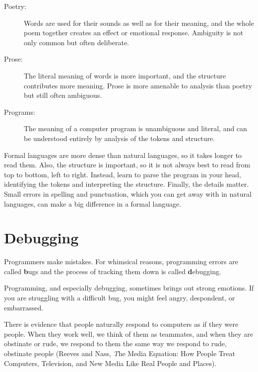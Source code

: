 \documentclass[
DIV=11,
fontsize=13,
twoside,
headinclude=false,
titlepage=firstiscover,
abstract=true,
headsepline=true,
footsepline=true,
chapterprefix=true, %
headings=big,
bibliography=totoc,%
captions=tableheading
]{scrbook}
\theoremstyle{definition}
\begin{document}
\begin{description}

\item[Poetry:] Words are used for their sounds as well as for
their meaning, and the whole poem together creates an effect or
emotional response.  Ambiguity is not only common but often
deliberate.

\item[Prose:] The literal meaning of words is more important,
and the structure contributes more meaning.  Prose is more amenable to
analysis than poetry but still often ambiguous.

\item[Programs:] The meaning of a computer program is unambiguous
and literal, and can be understood entirely by analysis of the
tokens and structure.

\end{description}

Formal languages are more dense
than natural languages, so it takes longer to read them.  Also, the
structure is important, so it is not always best to read
from top to bottom, left to right.  Instead, learn to parse the
program in your head, identifying the tokens and interpreting the
structure.  Finally, the details matter.  Small errors in
spelling and punctuation, which you can get away
with in natural languages, can make a big difference in a formal
language.


\section{Debugging}

Programmers make mistakes.  For whimsical reasons, programming errors
are called {\textbf bugs} and the process of tracking them down is called
{\textbf debugging}.

Programming, and especially debugging, sometimes brings out strong
emotions.  If you are struggling with a difficult bug, you might 
feel angry, despondent, or embarrassed.

There is evidence that people naturally respond to computers as if
they were people.  When they work well, we think
of them as teammates, and when they are obstinate or rude, we
respond to them the same way we respond to rude,
obstinate people (Reeves and Nass, {\textit The Media
    Equation: How People Treat Computers, Television, and New Media
    Like Real People and Places}).
\end{document}
